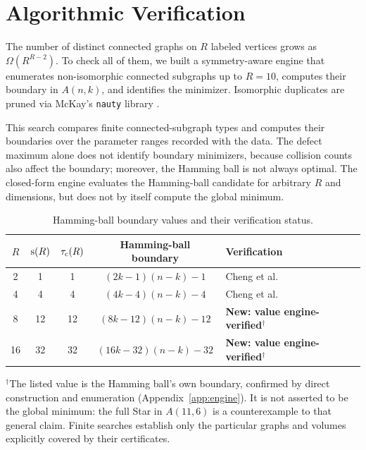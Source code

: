 \section{Algorithmic Verification}

The number of distinct connected graphs on $R$ labeled vertices grows as
$\Omega(R^{R-2})$. To check all of them, we built a symmetry-aware engine that
enumerates non-isomorphic connected subgraphs up to $R = 10$, computes their
boundary in $A(n,k)$, and identifies the minimizer. Isomorphic duplicates are
pruned via McKay's \texttt{nauty} library \cite{mckay2014practical}.

This search compares finite connected-subgraph types and computes their
boundaries over the parameter ranges recorded with the data. The defect
maximum alone does not identify boundary minimizers, because collision counts
also affect the boundary; moreover, the Hamming ball is not always optimal.
The closed-form engine evaluates the Hamming-ball candidate for arbitrary
$R$ and dimensions, but does not by itself compute the global minimum.

\begin{table}[ht]
	\centering
\caption{Hamming-ball boundary values and their verification status.}
	\label{tab:engine}
	\begin{tabular}{@{}ccccl@{}}
		\toprule
$R$ & $\mathrm{s}(R)$ & $\tau_{\mathrm{c}}(R)$ & Hamming-ball boundary & Verification                                   \\
		\midrule
		2   & 1          & 1            & $(2k-1)(n-k)-1$        & Cheng et al. \cite{cheng2022extraconnectivity} \\
		4   & 4          & 4            & $(4k-4)(n-k)-4$        & Cheng et al. \cite{cheng2022extraconnectivity} \\
		8   & 12         & 12           & $(8k-12)(n-k)-12$      & \textbf{New: value engine-verified}$^\dagger$  \\
		16  & 32         & 32           & $(16k-32)(n-k)-32$     & \textbf{New: value engine-verified}$^\dagger$  \\
		\bottomrule
	\end{tabular}
\end{table}
	\noindent $^\dagger$\small The listed value is the Hamming ball's own boundary,
	confirmed by direct construction and enumeration (Appendix~\ref{app:engine}).
	It is not asserted to be the global minimum: the full Star in $A(11,6)$ is
	a counterexample to that general claim. Finite searches establish only the
	particular graphs and volumes explicitly covered by their certificates.

